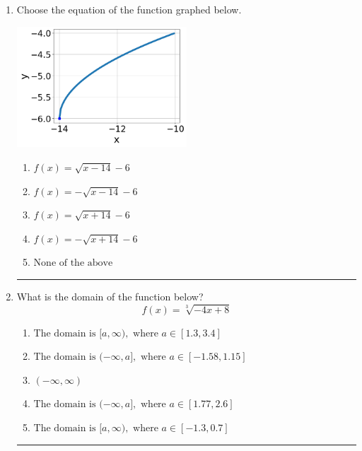 \documentclass[14pt]{extbook}
\newcommand{\litem}[1]{\item#1\hspace*{-1cm}\rule{\textwidth}{0.4pt}}
\begin{document}
\begin{enumerate}
{\begin{enumerate}[label=\Alph*.]
\end{enumerate} }
\litem{
Choose the equation of the function graphed below.
\begin{center}
    \includegraphics[width=0.5\textwidth]{../Figures/radicalGraphToEquationCopyB.png}
\end{center}
\begin{enumerate}[label=\Alph*.]
\item \( f(x) = \sqrt{x - 14} - 6 \)
\item \( f(x) = - \sqrt{x - 14} - 6 \)
\item \( f(x) = \sqrt{x + 14} - 6 \)
\item \( f(x) = - \sqrt{x + 14} - 6 \)
\item \( \text{None of the above} \)

\end{enumerate} }
\litem{
What is the domain of the function below?\[ f(x) = \sqrt[3]{-4 x + 8} \]\begin{enumerate}[label=\Alph*.]
\item \( \text{The domain is } [a, \infty), \text{   where } a \in [1.3, 3.4] \)
\item \( \text{The domain is } (-\infty, a], \text{   where } a \in [-1.58, 1.15] \)
\item \( (-\infty, \infty) \)
\item \( \text{The domain is } (-\infty, a], \text{   where } a \in [1.77, 2.6] \)
\item \( \text{The domain is } [a, \infty), \text{   where } a \in [-1.3, 0.7] \)


\end{enumerate}}
\end{enumerate}
\end{document}
